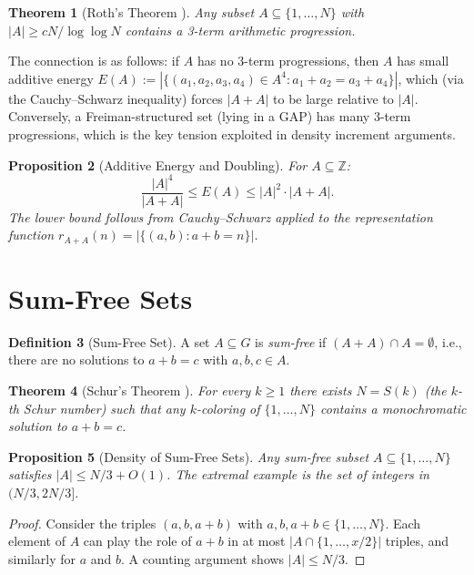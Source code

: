 \documentclass[12pt,a4paper]{amsart}
\newtheorem{theorem}{Theorem}[section]
\newtheorem{proposition}[theorem]{Proposition}
\theoremstyle{definition}
\newtheorem{definition}[theorem]{Definition}
\theoremstyle{remark}
\newcommand{\Z}{\mathbb{Z}}
\begin{document}
\begin{theorem}[Roth's Theorem \cite{Roth1953}]\label{thm:roth}
Any subset $A \subseteq \{1, \ldots, N\}$ with
$|A| \geq c N / \log\log N$
contains a 3-term arithmetic progression.
\end{theorem}

The connection is as follows: if $A$ has no 3-term progressions, then $A$ has
small additive energy $E(A) := |\{(a_1, a_2, a_3, a_4) \in A^4: a_1+a_2=a_3+a_4\}|$,
which (via the Cauchy--Schwarz inequality) forces $|A + A|$ to be large relative
to $|A|$. Conversely, a Freiman-structured set (lying in a GAP) has many 3-term
progressions, which is the key tension exploited in density increment arguments.

\begin{proposition}[Additive Energy and Doubling]\label{prop:energy_doubling}
For $A \subseteq \Z$:
\[
  \frac{|A|^4}{|A + A|} \leq E(A) \leq |A|^2 \cdot |A+A|.
\]
The lower bound follows from Cauchy--Schwarz applied to the representation function
$r_{A+A}(n) = |\{(a, b): a+b=n\}|$.
\end{proposition}

\section{Sum-Free Sets}\label{sec:sumfree}

\begin{definition}[Sum-Free Set]
A set $A \subseteq G$ is \emph{sum-free} if $(A + A) \cap A = \emptyset$, i.e.,
there are no solutions to $a + b = c$ with $a, b, c \in A$.
\end{definition}

\begin{theorem}[Schur's Theorem \cite{Schur1916}]\label{thm:schur}
For every $k \geq 1$ there exists $N = S(k)$ (the $k$-th Schur number) such that
any $k$-coloring of $\{1, \ldots, N\}$ contains a monochromatic solution to
$a + b = c$.
\end{theorem}

\begin{proposition}[Density of Sum-Free Sets]\label{prop:sumfree_density}
Any sum-free subset $A \subseteq \{1, \ldots, N\}$ satisfies $|A| \leq N/3 + O(1)$.
The extremal example is the set of integers in $(N/3, 2N/3]$.
\end{proposition}

\begin{proof}
Consider the triples $(a, b, a+b)$ with $a, b, a+b \in \{1, \ldots, N\}$.
Each element of $A$ can play the role of $a+b$ in at most $|A \cap \{1,\ldots,x/2\}|$
triples, and similarly for $a$ and $b$. A counting argument shows $|A| \leq N/3$.
\end{proof}
\end{document}

